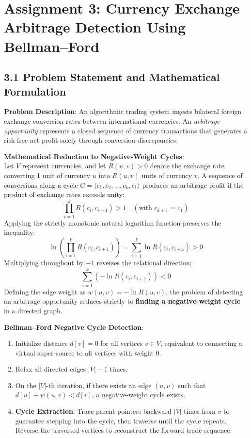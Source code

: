 \documentclass[12pt]{article}
\begin{document}
\newpage

\section*{Assignment 3: Currency Exchange Arbitrage Detection Using Bellman–Ford}

\subsection*{3.1 Problem Statement and Mathematical Formulation}
\textbf{Problem Description}: An algorithmic trading system ingests bilateral foreign exchange conversion rates between international currencies. An \textit{arbitrage opportunity} represents a closed sequence of currency transactions that generates a risk-free net profit solely through conversion discrepancies.

\textbf{Mathematical Reduction to Negative-Weight Cycles}:\\
Let $V$ represent currencies, and let $R(u, v) > 0$ denote the exchange rate converting 1 unit of currency $u$ into $R(u, v)$ units of currency $v$.
A sequence of conversions along a cycle $C = \langle c_1, c_2, \dots, c_k, c_1 \rangle$ produces an arbitrage profit if the product of exchange rates exceeds unity:
\[
\prod_{i=1}^k R(c_i, c_{i+1}) > 1 \quad (\text{with } c_{k+1} = c_1)
\]
Applying the strictly monotonic natural logarithm function preserves the inequality:
\[
\ln \left( \prod_{i=1}^k R(c_i, c_{i+1}) \right) = \sum_{i=1}^k \ln R(c_i, c_{i+1}) > 0
\]
Multiplying throughout by $-1$ reverses the relational direction:
\[
\sum_{i=1}^k \left( -\ln R(c_i, c_{i+1}) \right) < 0
\]
Defining the edge weight as $w(u, v) = -\ln R(u, v)$, the problem of detecting an arbitrage opportunity reduces strictly to \textbf{finding a negative-weight cycle} in a directed graph.

\textbf{Bellman--Ford Negative Cycle Detection}:
\begin{enumerate}
    \item Initialize distance $d[v] = 0$ for all vertices $v \in V$, equivalent to connecting a virtual super-source to all vertices with weight 0.
    \item Relax all directed edges $|V| - 1$ times.
    \item On the $|V|$-th iteration, if there exists an edge $(u, v)$ such that $d[u] + w(u, v) < d[v]$, a negative-weight cycle exists.
    \item \textbf{Cycle Extraction}: Trace parent pointers backward $|V|$ times from $v$ to guarantee stepping into the cycle, then traverse until the cycle repeats. Reverse the traversed vertices to reconstruct the forward trade sequence.
\end{enumerate}
\end{document}
